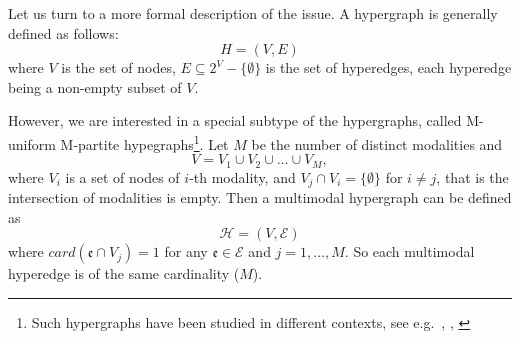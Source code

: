 \documentclass{fundam}
\newcommand{\HEM}{\mathcal{E}}
\newcommand{\hem}{\mathfrak{e}}
\newcommand{\HGM}{\mathcal{H}}
\newcommand{\N}{ V }
\newcommand{\HG}{H}
\newcommand{\HE}{E}
\begin{document}
\medskip
Let us turn to a more formal description of the issue.
A hypergraph is generally defined as follows:
$$\HG=(\N, \HE)$$
where $\N$ is the set of nodes,
$\HE\subseteq 2^{\N}-\{\emptyset \}$ is the set of hyperedges, each hyperedge being a non-empty subset of $\N$.

\medskip
However, we are interested in a  special subtype of the hypergraphs, called M-uniform M-partite hypegraphs\footnote{ Such hypergraphs have been studied in different contexts, see e.g.\ \cite{Mycroft:2014}, \cite{Han:2020}, \cite{Schauz:2010}}.
Let $M$ be the number of distinct modalities and
$$\N=\N_1 \cup \N_2 \cup \dots \cup \N_M,$$ where $\N_i$ is a set of nodes of $i$-th   modality, and  $\N_j\cap \N_i = \{\emptyset\}$ for $i\ne j$, that is the intersection of modalities is empty.
Then a multimodal hypergraph can be defined as
$$\HGM=(\N,\HEM)$$
where  $card(\hem\cap \N_j)=1 $ for any $\hem \in \HEM$
 and $j=1,\dots,M$.
So each multimodal hyperedge is of the same cardinality ($M$).
\end{document}
